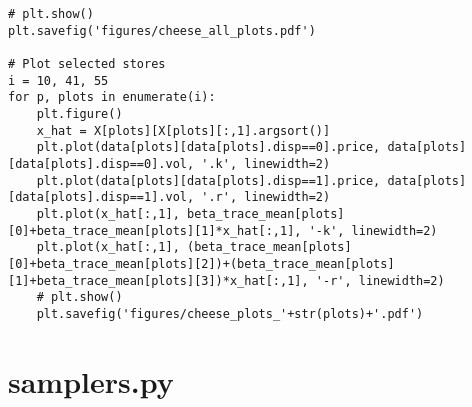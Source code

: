 \documentclass[11pt]{article}
\begin{document}
\begin{lstlisting}
# plt.show()
plt.savefig('figures/cheese_all_plots.pdf')

# Plot selected stores
i = 10, 41, 55
for p, plots in enumerate(i):
    plt.figure()
    x_hat = X[plots][X[plots][:,1].argsort()]
    plt.plot(data[plots][data[plots].disp==0].price, data[plots][data[plots].disp==0].vol, '.k', linewidth=2)
    plt.plot(data[plots][data[plots].disp==1].price, data[plots][data[plots].disp==1].vol, '.r', linewidth=2)
    plt.plot(x_hat[:,1], beta_trace_mean[plots][0]+beta_trace_mean[plots][1]*x_hat[:,1], '-k', linewidth=2)
    plt.plot(x_hat[:,1], (beta_trace_mean[plots][0]+beta_trace_mean[plots][2])+(beta_trace_mean[plots][1]+beta_trace_mean[plots][3])*x_hat[:,1], '-r', linewidth=2)
    # plt.show()
    plt.savefig('figures/cheese_plots_'+str(plots)+'.pdf')
    \end{lstlisting}

    \section*{samplers.py}
\end{document}
